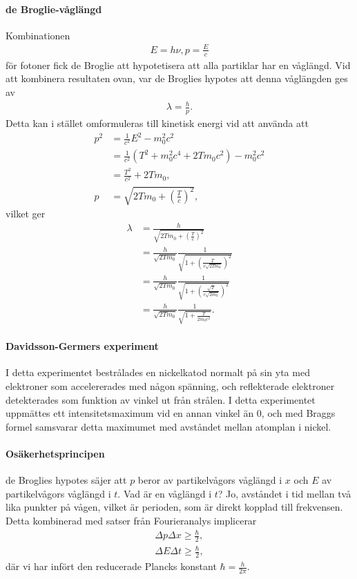 \paragraph{de Broglie-våglängd}
Kombinationen
\begin{align*}
	E = h\nu, p = \frac{E}{c}
\end{align*}
för fotoner fick de Broglie att hypotetisera att alla partiklar har en våglängd. Vid att kombinera resultaten ovan, var de Broglies hypotes att denna våglängden ges av
\begin{align*}
	\lambda = \frac{h}{p}.
\end{align*}
Detta kan i stället omformuleras till kinetisk energi vid att använda att
\begin{align*}
	p^{2} &= \frac{1}{c^{2}}E^{2} - m_{0}^{2}c^{2} \\
	      &= \frac{1}{c^{2}}(T^{2} + m_{0}^{2}c^{4} + 2Tm_{0}c^{2}) - m_{0}^{2}c^{2} \\
	      &= \frac{T^{2}}{c^{2}} + 2Tm_{0}, \\
	p     &= \sqrt{2Tm_{0} + \left(\frac{T}{c}\right)^{2}},
\end{align*}
vilket ger
\begin{align*}
	\lambda &= \frac{h}{\sqrt{2Tm_{0} + \left(\frac{T}{c}\right)^{2}}} \\
	        &= \frac{h}{\sqrt{2Tm_{0}}}\frac{1}{\sqrt{1 + \left(\frac{T}{c\sqrt{2Tm_{0}}}\right)^{2}}} \\
	        &= \frac{h}{\sqrt{2Tm_{0}}}\frac{1}{\sqrt{1 + \left(\frac{\sqrt{T}}{c\sqrt{2m_{0}}}\right)^{2}}} \\
	        &= \frac{h}{\sqrt{2Tm_{0}}}\frac{1}{\sqrt{1 + \frac{T}{2m_{0}c^{2}}}}.
\end{align*}

\paragraph{Davidsson-Germers experiment}
I detta experimentet bestrålades en nickelkatod normalt på sin yta med elektroner som accelererades med någon spänning, och reflekterade elektroner detekterades som funktion av vinkel ut från strålen. I detta experimentet uppmättes ett intensitetsmaximum vid en annan vinkel än $0$, och med Braggs formel samsvarar detta maximumet med avståndet mellan atomplan i nickel.

\paragraph{Osäkerhetsprincipen}
de Broglies hypotes säjer att $p$ beror av partikelvågors våglängd i $x$ och $E$ av partikelvågors våglängd i $t$. Vad är en våglängd i $t$? Jo, avståndet i tid mellan två lika punkter på vågen, vilket är perioden, som är direkt kopplad till frekvensen. Detta kombinerad med satser från Fourieranalys implicerar
\begin{align*}
	\Delta p \Delta x \geq \frac{\hbar}{2}, \\
	\Delta E \Delta t \geq \frac{\hbar}{2},
\end{align*}
där vi har infört den reducerade Plancks konstant $\hbar = \frac{h}{2\pi}$.

